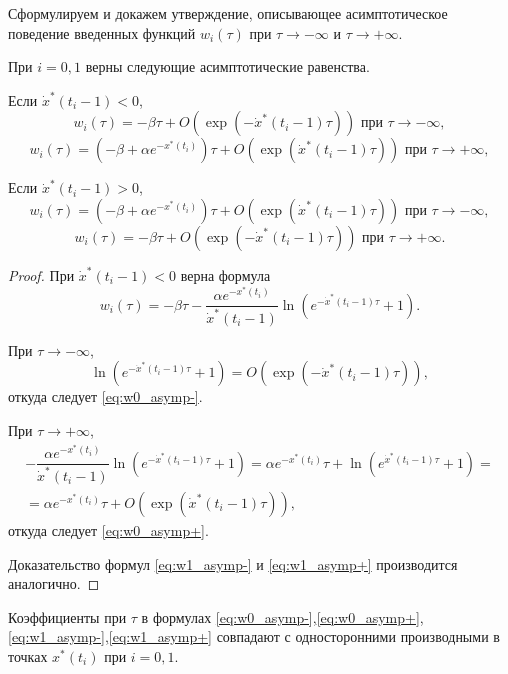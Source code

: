 Сформулируем и докажем утверждение, описывающее асимптотическое поведение введенных функций $w_i(\tau)$ при $\tau\to-\infty$ и $\tau\to+\infty$.
%
\begin{lemma}\label{lm:lem_w_asymp} При $i = 0, 1$ верны следующие асимптотические равенства.

Если $\dot{x}^*(t_i - 1) < 0$,
\begin{equation}
	\label{eq:w0_asymp-}
	w_i(\tau) = -\beta \tau + O(\exp(-\dot{x}^*(t_i - 1) \tau)) \text{ при } \tau \to -\infty,
\end{equation}
\begin{equation}
	\label{eq:w0_asymp+}
	w_i(\tau) = (-\beta + \alpha e^{-x^*(t_i)})\tau + O(\exp(\dot{x}^*(t_i - 1) \tau)) \text{ при } \tau \to +\infty,
\end{equation}
	
Если $\dot{x}^*(t_i - 1) > 0$,
\begin{equation}
	\label{eq:w1_asymp-}
	w_i(\tau) = (-\beta + \alpha e^{-x^*(t_i)})\tau + O(\exp(\dot{x}^*(t_i - 1) \tau)) \text{ при } \tau \to -\infty,
\end{equation}
\begin{equation}
	\label{eq:w1_asymp+}
	w_i(\tau) = -\beta \tau + O(\exp(-\dot{x}^*(t_i - 1) \tau)) \text{ при } \tau \to +\infty.
\end{equation}
\end{lemma}
\begin{proof}
	При $\dot{x}^*(t_i - 1) < 0$ верна формула
	\[
	w_i(\tau) = -\beta \tau - \dfrac{\alpha e^{-x^*(t_i)}}{\dot{x}^*(t_i - 1)} \ln\left(e^{-\dot{x}^*(t_i - 1)\tau} + 1\right).
	\]
	
	При $\tau \to -\infty$,
	\[
	\ln\left(e^{-\dot{x}^*(t_i - 1)\tau} + 1\right) = O(\exp(-\dot{x}^*(t_i - 1)\tau)),
	\]
	 откуда следует \eqref{eq:w0_asymp-}.
	 
	При $\tau \to +\infty$,
	\begin{multline*}
	-\dfrac{\alpha e^{-x^*(t_i)}}{\dot{x}^*(t_i - 1)} \ln\left(e^{-\dot{x}^*(t_i - 1)\tau} + 1\right) = \alpha e^{-x^*(t_i)} \tau + \ln\left(e^{\dot{x}^*(t_i - 1)\tau} + 1\right) =\\
	= \alpha e^{-x^*(t_i)} \tau + O(\exp(\dot{x}^*(t_i - 1) \tau)),
	\end{multline*}
	откуда следует \eqref{eq:w0_asymp+}.
	
	Доказательство формул \eqref{eq:w1_asymp-} и \eqref{eq:w1_asymp+} производится аналогично.
\end{proof}

\begin{remark}
	Коэффициенты при $\tau$ в формулах \eqref{eq:w0_asymp-},\eqref{eq:w0_asymp+},\eqref{eq:w1_asymp-},\eqref{eq:w1_asymp+} совпадают с односторонними производными в точках $x^*(t_i)$ при $i = 0, 1$. 
\end{remark}

